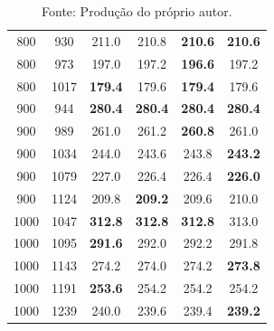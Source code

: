 \begin{table}[ht]
\begin{minipage}{0.45\textwidth}
\begin{tabular}{|c|c|c|c|c|c|}
        800 & 930 & 211.0 & 210.8 & \cellcolor{blue!20} \textbf{210.6} & \cellcolor{blue!20} \textbf{210.6} \\
        800 & 973 & 197.0 & 197.2 & \cellcolor{blue!20} \textbf{196.6} & 197.2 \\
        800 & 1017 & \cellcolor{blue!20} \textbf{179.4} & 179.6 & \cellcolor{blue!20} \textbf{179.4} & 179.6 \\
        900 & 944 & \cellcolor{blue!20} \textbf{280.4} & \cellcolor{blue!20} \textbf{280.4} & \cellcolor{blue!20} \textbf{280.4} & \cellcolor{blue!20} \textbf{280.4} \\
        900 & 989 & 261.0 & 261.2 & \cellcolor{blue!20} \textbf{260.8} & 261.0 \\
        900 & 1034 & 244.0 & 243.6 & 243.8 & \cellcolor{blue!20} \textbf{243.2} \\
        900 & 1079 & 227.0 & 226.4 & 226.4 & \cellcolor{blue!20} \textbf{226.0} \\
        900 & 1124 & 209.8 & \cellcolor{blue!20} \textbf{209.2} & 209.6 & 210.0 \\
        1000 & 1047 & \cellcolor{blue!20} \textbf{312.8} & \cellcolor{blue!20} \textbf{312.8} & \cellcolor{blue!20} \textbf{312.8} & 313.0 \\
        1000 & 1095 & \cellcolor{blue!20} \textbf{291.6} & 292.0 & 292.2 & 291.8 \\
        1000 & 1143 & 274.2 & 274.0 & 274.2 & \cellcolor{blue!20} \textbf{273.8} \\
        1000 & 1191 & \cellcolor{blue!20} \textbf{253.6} & 254.2 & 254.2 & 254.2 \\
        1000 & 1239 & 240.0 & 239.6 & 239.4 & \cellcolor{blue!20} \textbf{239.2} \\
        \hline
    \end{tabular}
    \caption*{\small Fonte: Produção do próprio autor.}
    \label{tab:construct-regressao-large}
\end{minipage}
\end{table}
